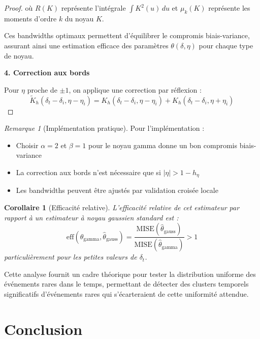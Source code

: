 \documentclass[12pt,a4paper]{article}
\newtheorem{corollary}[theorem]{Corollaire}
\theoremstyle{definition}
\theoremstyle{remark}
\newtheorem{remark}[theorem]{Remarque}
\begin{document}
\begin{proof}
    où \(R(K)\) représente l'intégrale \( \int K^2(u) \, du \) et \(\mu_k(K)\) représente les moments d'ordre \(k\) du noyau \(K\).

    Ces bandwidths optimaux permettent d'équilibrer le compromis biais-variance, assurant ainsi une estimation efficace des paramètres \(\theta(\delta, \eta)\) pour chaque type de noyau.
    
    \textbf{4. Correction aux bords}
    
    Pour $\eta$ proche de $\pm 1$, on applique une correction par réflexion :
    \[
    \tilde{K}_h(\delta_t - \delta_i, \eta - \eta_i) = K_h(\delta_t - \delta_i, \eta - \eta_i) + K_h(\delta_t - \delta_i, \eta + \eta_i)
    \]
    \end{proof}
    
    \begin{remark}[Implémentation pratique]
    Pour l'implémentation :
    \begin{itemize}
        \item Choisir $\alpha = 2$ et $\beta = 1$ pour le noyau gamma donne un bon compromis biais-variance
        \item La correction aux bords n'est nécessaire que si $|\eta| > 1-h_\eta$
        \item Les bandwidths peuvent être ajustés par validation croisée locale
    \end{itemize}
    \end{remark}
    
    \begin{corollary}[Efficacité relative]
    L'efficacité relative de cet estimateur par rapport à un estimateur à noyau gaussien standard est :
    \[
    \text{eff}(\hat{\theta}_{\text{gamma}}, \hat{\theta}_{\text{gauss}}) = \frac{\text{MISE}(\hat{\theta}_{\text{gauss}})}{\text{MISE}(\hat{\theta}_{\text{gamma}})} > 1
    \]
    particulièrement pour les petites valeurs de $\delta_t$.
    \end{corollary}
    


    Cette analyse fournit un cadre théorique pour tester la distribution uniforme des événements rares dans le temps, permettant de détecter des clusters temporels significatifs d'événements rares qui s'écarteraient de cette uniformité attendue.


    \newpage
    \section*{Conclusion}
    \newpage
\end{document}
